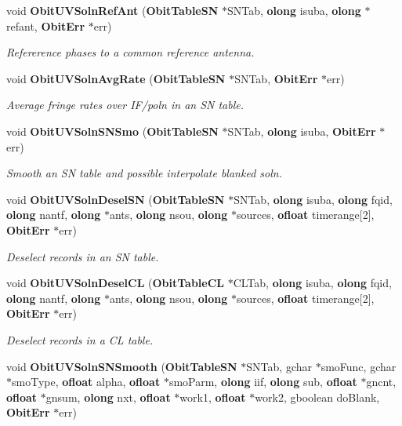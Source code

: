 \begin{CompactItemize}
void {\bf Obit\-UVSoln\-Ref\-Ant} ({\bf Obit\-Table\-SN} $\ast$SNTab, {\bf olong} isuba, {\bf olong} $\ast$refant, {\bf Obit\-Err} $\ast$err)
\begin{CompactList}\small\item\em Refererence phases to a common reference antenna. \item\end{CompactList}\item 
void {\bf Obit\-UVSoln\-Avg\-Rate} ({\bf Obit\-Table\-SN} $\ast$SNTab, {\bf Obit\-Err} $\ast$err)
\begin{CompactList}\small\item\em Average fringe rates over IF/poln in an SN table. \item\end{CompactList}\item 
void {\bf Obit\-UVSoln\-SNSmo} ({\bf Obit\-Table\-SN} $\ast$SNTab, {\bf olong} isuba, {\bf Obit\-Err} $\ast$err)
\begin{CompactList}\small\item\em Smooth an SN table and possible interpolate blanked soln. \item\end{CompactList}\item 
void {\bf Obit\-UVSoln\-Desel\-SN} ({\bf Obit\-Table\-SN} $\ast$SNTab, {\bf olong} isuba, {\bf olong} fqid, {\bf olong} nantf, {\bf olong} $\ast$ants, {\bf olong} nsou, {\bf olong} $\ast$sources, {\bf ofloat} timerange[2], {\bf Obit\-Err} $\ast$err)
\begin{CompactList}\small\item\em Deselect records in an SN table. \item\end{CompactList}\item 
void {\bf Obit\-UVSoln\-Desel\-CL} ({\bf Obit\-Table\-CL} $\ast$CLTab, {\bf olong} isuba, {\bf olong} fqid, {\bf olong} nantf, {\bf olong} $\ast$ants, {\bf olong} nsou, {\bf olong} $\ast$sources, {\bf ofloat} timerange[2], {\bf Obit\-Err} $\ast$err)
\begin{CompactList}\small\item\em Deselect records in a CL table. \item\end{CompactList}\item 
void {\bf Obit\-UVSoln\-SNSmooth} ({\bf Obit\-Table\-SN} $\ast$SNTab, gchar $\ast$smo\-Func, gchar $\ast$smo\-Type, {\bf ofloat} alpha, {\bf ofloat} $\ast$smo\-Parm, {\bf olong} iif, {\bf olong} sub, {\bf ofloat} $\ast$gncnt, {\bf ofloat} $\ast$gnsum, {\bf olong} nxt, {\bf ofloat} $\ast$work1, {\bf ofloat} $\ast$work2, gboolean do\-Blank, {\bf Obit\-Err} $\ast$err)

\end{CompactItemize}

